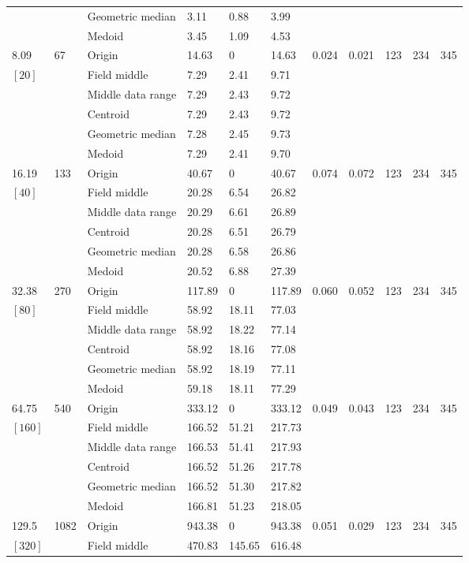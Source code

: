 \documentclass[phd]{ndsu-thesis-2022}
\begin{document}
\begin{landscape}
{{\begin{ThreePartTable}
\begin{longtable}{lll lll ll rrr}
 &  & Geometric median & 3.11 & 0.88 & 3.99 \\
 &  & Medoid  & 3.45 & 1.09 & 4.53 \\
\midrule
8.09 & 67 & Origin  & 14.63 & 0 & 14.63 & 0.024 & 0.021 & 123 & 234 & 345 \\
$[20]$ &  & Field middle  & 7.29 & 2.41 & 9.71 \\
 &  & Middle data range  & 7.29 & 2.43 & 9.72 \\
 &  & Centroid & 7.29 & 2.43 & 9.72 \\
 &  & Geometric median & 7.28 & 2.45 & 9.73 \\
 &  & Medoid  & 7.29 & 2.41 & 9.70 \\ 
\midrule
16.19 & 133 & Origin  & 40.67 & 0 & 40.67 & 0.074 & 0.072 & 123 & 234 & 345 \\
$[40]$ &  & Field middle  & 20.28 & 6.54 & 26.82 \\
 &  & Middle data range  & 20.29 & 6.61 & 26.89 \\
 &  & Centroid & 20.28 & 6.51 & 26.79 \\
 &  & Geometric median & 20.28 & 6.58 & 26.86 \\
 &  & Medoid  & 20.52 & 6.88 & 27.39 \\
\midrule
32.38 & 270 & Origin  & 117.89 & 0 & 117.89 & 0.060 & 0.052 & 123 & 234 & 345 \\
$[80]$ &  & Field middle  & 58.92 & 18.11 & 77.03 \\
 &  & Middle data range  & 58.92 & 18.22 & 77.14 \\
 &  & Centroid & 58.92 & 18.16 & 77.08 \\
 &  & Geometric median & 58.92 & 18.19 & 77.11 \\
 &  & Medoid  & 59.18 & 18.11 & 77.29 \\
\midrule
64.75 & 540 & Origin  & 333.12 & 0 & 333.12 & 0.049 & 0.043 & 123 & 234 & 345 \\
$[160]$ &  & Field middle  & 166.52 & 51.21 & 217.73 \\
 &  & Middle data range  & 166.53 & 51.41 & 217.93 \\
 &  & Centroid & 166.52 & 51.26 & 217.78 \\
 &  & Geometric median & 166.52 & 51.30 & 217.82 \\
 &  & Medoid  & 166.81 & 51.23 & 218.05 \\
\midrule
129.5 & 1082 & Origin  & 943.38 & 0 & 943.38 & 0.051 & 0.029 & 123 & 234 & 345 \\
$[320]$ &  & Field middle  & 470.83 & 145.65 & 616.48 \\

\end{longtable}
\end{ThreePartTable}}}
\end{landscape}
\end{document}
